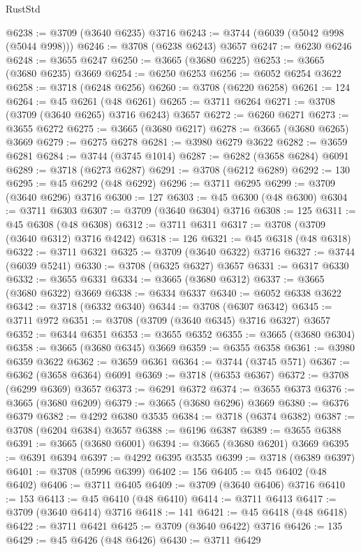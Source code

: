 \begin{lexlean}{RustStd}
\begin{coremodule}
@6238 := @3709 (@3640 @6235) @3716
@6243 := @3744 (@6039 (@5042 @998 (@5044 @998)))
@6246 := @3708 (@6238 @6243) @3657
@6247 := @6230 @6246
@6248 := @3655 @6247
@6250 := @3665 (@3680 @6225)
@6253 := @3665 (@3680 @6235) @3669
@6254 := @6250 @6253
@6256 := @6052 @6254 @3622
@6258 := @3718 (@6248 @6256)
@6260 := @3708 (@6220 @6258)
@6261 := 124
@6264 := @45 @6261 (@48 @6261)
@6265 := @3711 @6264
@6271 := @3708 (@3709 (@3640 @6265) @3716 @6243) @3657
@6272 := @6260 @6271
@6273 := @3655 @6272
@6275 := @3665 (@3680 @6217)
@6278 := @3665 (@3680 @6265) @3669
@6279 := @6275 @6278
@6281 := @3980 @6279 @3622
@6282 := @3659 @6281
@6284 := @3744 (@3745 @1014)
@6287 := @6282 (@3658 @6284) @6091
@6289 := @3718 (@6273 @6287)
@6291 := @3708 (@6212 @6289)
@6292 := 130
@6295 := @45 @6292 (@48 @6292)
@6296 := @3711 @6295
@6299 := @3709 (@3640 @6296) @3716
@6300 := 127
@6303 := @45 @6300 (@48 @6300)
@6304 := @3711 @6303
@6307 := @3709 (@3640 @6304) @3716
@6308 := 125
@6311 := @45 @6308 (@48 @6308)
@6312 := @3711 @6311
@6317 := @3708 (@3709 (@3640 @6312) @3716 @4242)
@6318 := 126
@6321 := @45 @6318 (@48 @6318)
@6322 := @3711 @6321
@6325 := @3709 (@3640 @6322) @3716
@6327 := @3744 (@6039 @5241)
@6330 := @3708 (@6325 @6327) @3657
@6331 := @6317 @6330
@6332 := @3655 @6331
@6334 := @3665 (@3680 @6312)
@6337 := @3665 (@3680 @6322) @3669
@6338 := @6334 @6337
@6340 := @6052 @6338 @3622
@6342 := @3718 (@6332 @6340)
@6344 := @3708 (@6307 @6342)
@6345 := @3711 @972
@6351 := @3708 (@3709 (@3640 @6345) @3716 @6327) @3657
@6352 := @6344 @6351
@6353 := @3655 @6352
@6355 := @3665 (@3680 @6304)
@6358 := @3665 (@3680 @6345) @3669
@6359 := @6355 @6358
@6361 := @3980 @6359 @3622
@6362 := @3659 @6361
@6364 := @3744 (@3745 @571)
@6367 := @6362 (@3658 @6364) @6091
@6369 := @3718 (@6353 @6367)
@6372 := @3708 (@6299 @6369) @3657
@6373 := @6291 @6372
@6374 := @3655 @6373
@6376 := @3665 (@3680 @6209)
@6379 := @3665 (@3680 @6296) @3669
@6380 := @6376 @6379
@6382 := @4292 @6380 @3535
@6384 := @3718 (@6374 @6382)
@6387 := @3708 (@6204 @6384) @3657
@6388 := @6196 @6387
@6389 := @3655 @6388
@6391 := @3665 (@3680 @6001)
@6394 := @3665 (@3680 @6201) @3669
@6395 := @6391 @6394
@6397 := @4292 @6395 @3535
@6399 := @3718 (@6389 @6397)
@6401 := @3708 (@5996 @6399)
@6402 := 156
@6405 := @45 @6402 (@48 @6402)
@6406 := @3711 @6405
@6409 := @3709 (@3640 @6406) @3716
@6410 := 153
@6413 := @45 @6410 (@48 @6410)
@6414 := @3711 @6413
@6417 := @3709 (@3640 @6414) @3716
@6418 := 141
@6421 := @45 @6418 (@48 @6418)
@6422 := @3711 @6421
@6425 := @3709 (@3640 @6422) @3716
@6426 := 135
@6429 := @45 @6426 (@48 @6426)
@6430 := @3711 @6429

\end{coremodule}
\end{lexlean}

